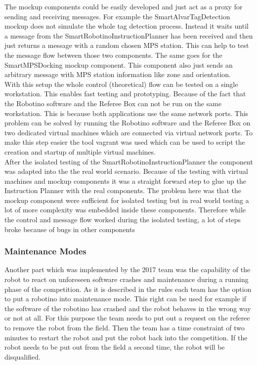 The mockup components could be easily developed and just act as a proxy for sending and receiving messages. For example the SmartAlvarTagDetection mockup does not simulate the whole tag detection process. Instead it waits until a message from the SmartRobotinoInstructionPlanner has been received and then just returns a message with a random chosen MPS station. This can help to test the message flow between those two components. The same goes for the SmartMPSDocking mockup component. This component also just sends an arbitrary message with MPS station information like zone and orientation. \\

With this setup the whole control (theoretical) flow can be tested on a single workstation. This enables fast testing and prototyping. Because of the fact that the Robotino software and the Referee Box can not be run on the same workstation. This is because both applications use the same network ports. This problem can be solved by running the Robotino software and the Referee Box on two dedicated virtual machines which are connected via virtual network ports. To make this step easier the tool vagrant was used which can be used to script the creation and startup of multiple virtual machines. \\


After the isolated testing of the SmartRobotinoInstructionPlanner the component was adapted into the the real world scenario. Because of the testing with virtual machines and mockup components it was a straight forward step to glue up the Instruction Planner with the real components. The problem here was that the mockup component were sufficient for isolated testing but in real world testing a lot of more complexity was embedded inside these components. Therefore while the control and message flow worked during the isolated testing, a lot of steps broke because of bugs in other components  


\subsubsection{Maintenance Modes}

Another part which was implemented by the 2017 team was the capability of the robot to react on unforeseen software crashes and maintenance during a running phase of the competition. As it is described in the rules \cite{RCLL17} each team has the option to put a robotino into maintenance mode. This right can be used for example if the software of the robotino has crashed and the robot behaves in the wrong way or not at all. For this purpose the team needs to put out a request on the referee to remove the robot from the field. Then the team has a time constraint of two minutes to restart the robot and put the robot back into the competition. If the robot needs to be put out from the field a second time, the robot will be disqualified. \\

